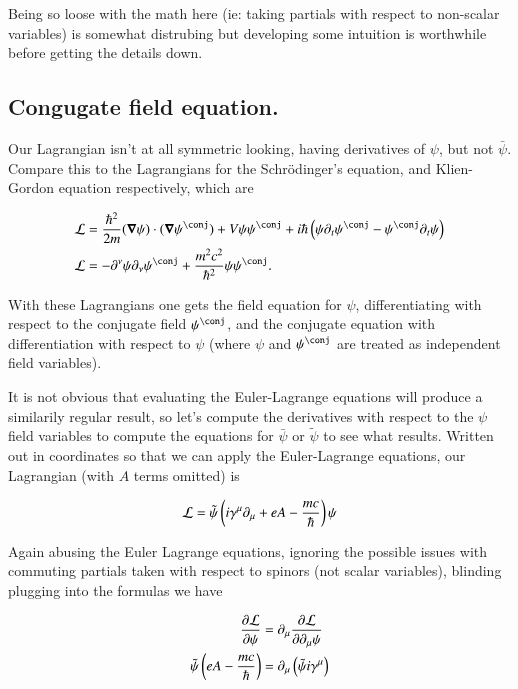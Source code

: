 \documentclass{article}
\begin{document}
Being so loose with the math here (ie: taking partials with respect to non-scalar variables) is somewhat distrubing but developing some intuition is worthwhile before getting the details down.

\subsection{ Congugate field equation. }

Our Lagrangian isn't at all symmetric looking, having derivatives of $\psi$, but not $\bar\psi$.  Compare this to the Lagrangians for the 
Schr\"{o}dinger's equation, and Klien-Gordon equation respectively, which are

\begin{align}
\LL &= \frac{\hbar^2}{2m}
(\spacegrad \psi) \cdot (\spacegrad \psi^\conj) + V \psi \psi^\conj + {i \hbar} \left( \psi \partial_t \psi^\conj - \psi^\conj \partial_t \psi \right) \\
\LL &= -\partial^\nu \psi \partial_\nu \psi^\conj + \frac{m^2 c^2}{\hbar^2} \psi \psi^\conj.
\end{align}

With these Lagrangians one gets the field equation for $\psi$, differentiating with respect to the conjugate field $\psi^\conj$, and the conjugate equation with differentiation with respect to $\psi$ (where $\psi$ and $\psi^\conj$ are treated as independent field variables).

It is not obvious that evaluating the Euler-Lagrange equations will produce a similarily regular result, so
let's compute the derivatives with respect to the $\psi$ field variables to compute the equations for $\bar \psi$ or $\tilde{\psi}$ to see what results.  Written out in coordinates so that we can apply the Euler-Lagrange equations, our Lagrangian (with $A$ terms omitted) is

\begin{align}\label{eqn:lag4}
\mathcal{L} = \tilde{\psi}\left( i \gamma^\mu \partial_\mu + e A - \frac{m c}{\hbar} \right) \psi
\end{align}

Again abusing the Euler Lagrange equations, ignoring the possible issues with commuting partials taken
with respect to spinors (not scalar variables), blinding plugging into the formulas we have

\begin{align*}
\frac{\partial {\mathcal{L}}}{\partial {\psi}} &= \partial_\mu \frac{\partial {\mathcal{L}}}{\partial {\partial_\mu \psi}} \\
\tilde{\psi}\left( e A - \frac{m c}{\hbar} \right) &= \partial_\mu \left(\tilde{\psi} i \gamma^\mu \right)
\end{align*}
\end{document}
